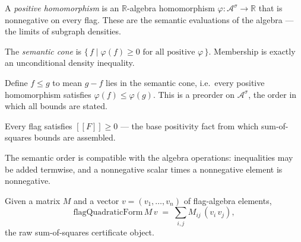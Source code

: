 \begin{definition}
  \label{def:positive-hom}
  \leanok
  A \emph{positive homomorphism} is an $\mathbb{R}$-algebra homomorphism
  $\varphi : \mathcal{A}^\sigma \to \mathbb{R}$ that is nonnegative on every flag.
  These are the semantic evaluations of the algebra --- the limits of subgraph
  densities.
\end{definition}

\begin{definition}
  \label{def:semantic-cone}
  \leanok
  The \emph{semantic cone} is $\{\, f \mid \varphi(f) \ge 0 \text{ for all
  positive } \varphi \,\}$. Membership is exactly an unconditional density
  inequality.
\end{definition}

\begin{definition}
  \label{def:semantic-order}
  \leanok
  Define $f \le g$ to mean $g - f$ lies in the semantic cone, i.e.\ every
  positive homomorphism satisfies $\varphi(f) \le \varphi(g)$. This is a preorder
  on $\mathcal{A}^\sigma$, the order in which all bounds are stated.
\end{definition}

\begin{theorem}
  \label{thm:flag-nonneg}
  \leanok
  Every flag satisfies $[\![F]\!] \ge 0$ --- the base positivity fact from which
  sum-of-squares bounds are assembled.
\end{theorem}

\begin{lemma}
  \label{lem:order-monotone}
  \leanok
  The semantic order is compatible with the algebra operations: inequalities may
  be added termwise, and a nonnegative scalar times a nonnegative element is
  nonnegative.
\end{lemma}

\begin{definition}
  \label{def:flag-quadratic-form}
  \leanok
  Given a matrix $M$ and a vector $v = (v_1,\dots,v_n)$ of flag-algebra elements,
  \[ \mathrm{flagQuadraticForm}\,M\,v \;=\; \sum_{i,j} M_{ij}\,(v_i\, v_j), \]
  the raw sum-of-squares certificate object.
\end{definition}

